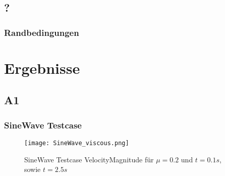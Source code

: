 \documentclass[
	11pt, %
	aspectratio=169, %
]{beamer}
\begin{document}
\subsection{?}
\begin{frame}
	\frametitle{Randbedingungen}

\end{frame}



\section{Ergebnisse}

\subsection{A1}
\begin{frame}
	\frametitle{SineWave Testcase}
	\begin{figure}
		\texttt{[image: SineWave\_viscous.png]}
		\caption{SineWave Testcase VelocityMagnitude für $\mu=0.2$ und $t=0.1s$, sowie $t=2.5s$}
	\end{figure}
	


\end{frame}
\end{document}
